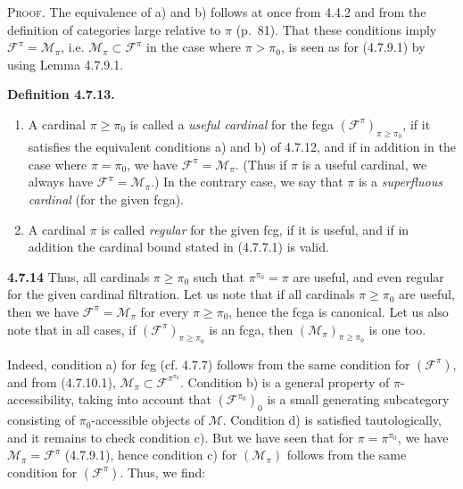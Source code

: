 \documentclass[11pt]{article}
\newcommand{\msp}[1]{\marginpar{\footnotesize [#1]}}
\begin{document}
\textsc{Proof}. The equivalence of a) and b) follows at once from 4.4.2 and from the definition of categories large relative to $\pi$ (p.~81). That these
\msp{page 179}
conditions imply $\mathcal{F}^{\pi}=\mathcal{M}_\pi$, i.e. $\mathcal{M}_\pi\subset\mathcal{F}^{\pi}$ in the case where $\pi>\pi_0$, is seen as for (4.7.9.1) by using Lemma 4.7.9.1.

\textbf{Definition 4.7.13.}
\begin{enumerate}[label={$\arabic*^{\circ}$)}]
\item A cardinal $\pi\geqslant\pi_0$ is called a \textit{useful cardinal} for the fcga $(\mathcal{F}^{\pi})_{\pi\geqslant\pi_0}$, if it satisfies the equivalent conditions a) and b) of 4.7.12, and if in addition in the case where $\pi=\pi_0$, we have $\mathcal{F}^{\pi}=\mathcal{M}_\pi$. (Thus if $\pi$ is a useful cardinal, we always have $\mathcal{F}^{\pi}=\mathcal{M}_\pi$.) In the contrary case, we say that $\pi$ is a \textit{superfluous cardinal} (for the given fcga). %
\item A cardinal $\pi$ is called \textit{regular} for the given fcg, if it is useful, and if in addition the cardinal bound stated in (4.7.7.1) is valid.
\end{enumerate}

\textbf{4.7.14} Thus, all cardinals $\pi\geqslant\pi_0$ such that $\pi^{\pi_0}=\pi$ are useful, and even regular for the given cardinal filtration. Let us note that if all cardinals $\pi\geqslant\pi_0$ are useful, then we have $\mathcal{F}^{\pi}=\mathcal{M}_\pi$ for every $\pi\geqslant\pi_0$, hence the fcga is canonical. Let us also note that in all cases, if $(\mathcal{F}^{\pi})_{\pi\geqslant\pi_0}$ is an fcga, then $(\mathcal{M}_\pi)_{\pi\geqslant\pi_0}$ is one too.

\noindent\msp{page 180}Indeed, condition a) for fcg (cf. 4.7.7) follows from the same condition for $(\mathcal{F}^{\pi})$, and from (4.7.10.1), $\mathcal{M}_\pi\subset\mathcal{F}^{\pi^{\pi_0}}$. Condition b) is a general property of $\pi$-accessibility, taking into account that $(\mathcal{F}^{\pi_0})_0$ is a small generating subcategory consisting of $\pi_0$-accessible objects of $\mathcal{M}$. Condition d) is satisfied tautologically, and it remains to check condition c). But we have seen that for $\pi=\pi^{\pi_0}$, we have $\mathcal{M}_\pi=\mathcal{F}^{\pi}$ (4.7.9.1), hence condition c) for $(\mathcal{M}_\pi)$ follows from the same condition for $(\mathcal{F}^{\pi})$. Thus, we find:
\end{document}
